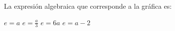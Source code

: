 La expresión algebraica que corresponde a la gráfica es:

\begin{oneparchoices}
    \choice $e=a$
    \CorrectChoice $e=\frac{a}{3}$
    \choice $e=6a$
    \choice $e=a-2$
\end{oneparchoices}